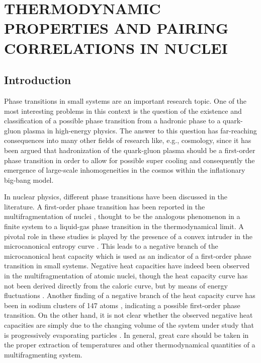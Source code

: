 \documentclass[preprint,rmp,aps,floatfix]{revtex4}
\begin{document}

%

\section{THERMODYNAMIC PROPERTIES AND PAIRING CORRELATIONS IN NUCLEI}
\label{sec:leveldensities_sec3}

\subsection{Introduction}

Phase transitions in small systems are an important research topic. One of the 
most interesting problems in this context is the question of the 
existence and classification of a possible phase transition from a hadronic 
phase to a quark-gluon plasma in high-energy physics. The answer to this 
question has far-reaching consequences into many other fields of research like,
e.g., cosmology, since it has been argued that hadronization of the quark-gluon
plasma should be a first-order phase transition in order to allow for possible 
super cooling and consequently the emergence of large-scale inhomogeneities in 
the cosmos within the inflationary big-bang model. 

In nuclear physics, different phase transitions have been discussed in the 
literature. A first-order phase transition has been reported in the 
multifragmentation of nuclei \cite{agostino00}, thought to be the analogous 
phenomenon in a finite system to a liquid-gas phase transition in the 
thermodynamical limit. A pivotal role in these studies is played by the 
presence of a convex intruder in the microcanonical entropy curve 
\cite{gross97,gross99}. This leads to a 
negative branch of the microcanonical heat 
capacity which is used as an indicator of a first-order phase transition in 
small systems. Negative heat capacities have indeed been observed in the 
multifragmentation of atomic nuclei, though the heat capacity curve has not 
been derived directly from the caloric curve, but by means of energy 
fluctuations \cite{agostino00,CD00}. 
Another finding of a negative branch of the heat
capacity curve has been in sodium clusters of 147 atoms \cite{schmidt01}, indicating
a possible first-order phase transition. On the other hand, it is not clear 
whether the observed negative heat capacities are simply due to the changing 
volume of the system under study that is progressively evaporating particles 
\cite{moretto01}. In general, great care should be 
taken in the proper extraction of
temperatures and other thermodynamical quantities of a multifragmenting system.
\end{document}
